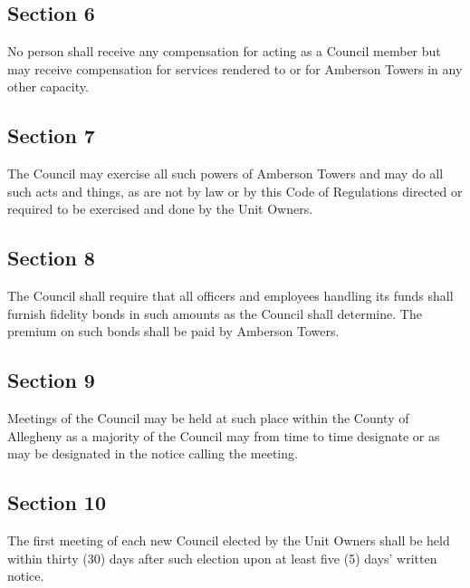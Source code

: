 \documentclass[
]{book}
\begin{document}
\hypertarget{section-6-1}{%
\subsection*{Section 6}\label{section-6-1}}

No person shall receive any compensation for acting as a Council member but may receive compensation for services rendered to or for Amberson Towers in any other capacity.

\hypertarget{section-7-1}{%
\subsection*{Section 7}\label{section-7-1}}

The Council may exercise all such powers of Amberson Towers and may do all such acts and things, as are not by law or by this Code of Regulations directed or required to be exercised and done by the Unit Owners.

\hypertarget{section-8-1}{%
\subsection*{Section 8}\label{section-8-1}}

The Council shall require that all officers and employees handling its funds shall furnish fidelity bonds in such amounts as the Council shall determine. The premium on such bonds shall be paid by Amberson Towers.

\hypertarget{section-9-1}{%
\subsection*{Section 9}\label{section-9-1}}

Meetings of the Council may be held at such place within the County of Allegheny as a majority of the Council may from time to time designate or as may be designated in the notice calling the meeting.

\hypertarget{section-10-1}{%
\subsection*{Section 10}\label{section-10-1}}

The first meeting of each new Council elected by the Unit Owners shall be held within thirty (30) days after such election upon at least five (5) days' written notice.
\end{document}
